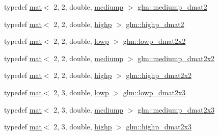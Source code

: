 \begin{DoxyCompactItemize}
typedef \mbox{\hyperlink{structglm_1_1mat}{mat}}$<$ 2, 2, double, \mbox{\hyperlink{namespaceglm_a36ed105b07c7746804d7fdc7cc90ff25a6416f3ea0c9025fb21ed50c4d6620482}{mediump}} $>$ \mbox{\hyperlink{group__core__precision_gadbf2ed2cfb596bd2ca7e980777c0acde}{glm\+::mediump\+\_\+dmat2}}
\item 
typedef \mbox{\hyperlink{structglm_1_1mat}{mat}}$<$ 2, 2, double, \mbox{\hyperlink{namespaceglm_a36ed105b07c7746804d7fdc7cc90ff25ac6f7eab42eacbb10d59a58e95e362074}{highp}} $>$ \mbox{\hyperlink{group__core__precision_ga10defb0dfd989f948d6783e2ca3889d3}{glm\+::highp\+\_\+dmat2}}
\item 
typedef \mbox{\hyperlink{structglm_1_1mat}{mat}}$<$ 2, 2, double, \mbox{\hyperlink{namespaceglm_a36ed105b07c7746804d7fdc7cc90ff25ae161af3fc695e696ce3bf69f7332bc2d}{lowp}} $>$ \mbox{\hyperlink{group__core__precision_gaa0f01b1fb1a32ca63036ee3de89681d4}{glm\+::lowp\+\_\+dmat2x2}}
\item 
typedef \mbox{\hyperlink{structglm_1_1mat}{mat}}$<$ 2, 2, double, \mbox{\hyperlink{namespaceglm_a36ed105b07c7746804d7fdc7cc90ff25a6416f3ea0c9025fb21ed50c4d6620482}{mediump}} $>$ \mbox{\hyperlink{group__core__precision_ga3d91f269872b4664d2f500b6dee986eb}{glm\+::mediump\+\_\+dmat2x2}}
\item 
typedef \mbox{\hyperlink{structglm_1_1mat}{mat}}$<$ 2, 2, double, \mbox{\hyperlink{namespaceglm_a36ed105b07c7746804d7fdc7cc90ff25ac6f7eab42eacbb10d59a58e95e362074}{highp}} $>$ \mbox{\hyperlink{group__core__precision_gad08aec6bf6b5ae7d486fbabb3b28f904}{glm\+::highp\+\_\+dmat2x2}}
\item 
typedef \mbox{\hyperlink{structglm_1_1mat}{mat}}$<$ 2, 3, double, \mbox{\hyperlink{namespaceglm_a36ed105b07c7746804d7fdc7cc90ff25ae161af3fc695e696ce3bf69f7332bc2d}{lowp}} $>$ \mbox{\hyperlink{group__core__precision_gae5263863de4793ff33184db9a6bd3620}{glm\+::lowp\+\_\+dmat2x3}}
\item 
typedef \mbox{\hyperlink{structglm_1_1mat}{mat}}$<$ 2, 3, double, \mbox{\hyperlink{namespaceglm_a36ed105b07c7746804d7fdc7cc90ff25a6416f3ea0c9025fb21ed50c4d6620482}{mediump}} $>$ \mbox{\hyperlink{group__core__precision_gaf3a6e61247ffcbbf9211186d0d250a2b}{glm\+::mediump\+\_\+dmat2x3}}
\item 
typedef \mbox{\hyperlink{structglm_1_1mat}{mat}}$<$ 2, 3, double, \mbox{\hyperlink{namespaceglm_a36ed105b07c7746804d7fdc7cc90ff25ac6f7eab42eacbb10d59a58e95e362074}{highp}} $>$ \mbox{\hyperlink{group__core__precision_gad7de433cb7f79959a191fc5c64fbfc4e}{glm\+::highp\+\_\+dmat2x3}}
\item 

\end{DoxyCompactItemize}
